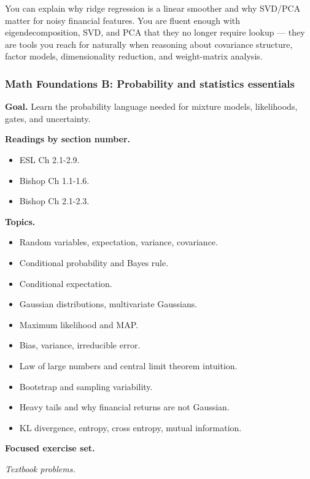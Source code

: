 You can explain why ridge regression is a linear smoother and why
SVD/PCA matter for noisy financial features. You are fluent enough with
eigendecomposition, SVD, and PCA that they no longer require lookup ---
they are tools you reach for naturally when reasoning about covariance
structure, factor models, dimensionality reduction, and weight-matrix
analysis.

\subsubsection{Math Foundations B: Probability and statistics
essentials}\label{math-foundations-b-probability-and-statistics-essentials}

\textbf{Goal.} Learn the probability language needed for mixture models,
likelihoods, gates, and uncertainty.

\textbf{Readings by section number.}

\begin{itemize}
\tightlist
\item
  ESL Ch 2.1-2.9.
\item
  Bishop Ch 1.1-1.6.
\item
  Bishop Ch 2.1-2.3.
\end{itemize}

\textbf{Topics.}

\begin{itemize}
\tightlist
\item
  Random variables, expectation, variance, covariance.
\item
  Conditional probability and Bayes rule.
\item
  Conditional expectation.
\item
  Gaussian distributions, multivariate Gaussians.
\item
  Maximum likelihood and MAP.
\item
  Bias, variance, irreducible error.
\item
  Law of large numbers and central limit theorem intuition.
\item
  Bootstrap and sampling variability.
\item
  Heavy tails and why financial returns are not Gaussian.
\item
  KL divergence, entropy, cross entropy, mutual information.
\end{itemize}

\textbf{Focused exercise set.}

\emph{Textbook problems.}

